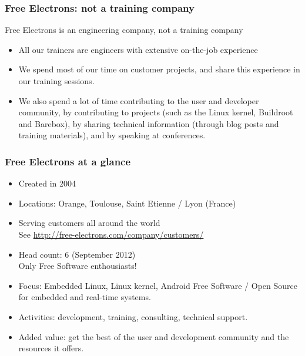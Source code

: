 \begin{frame}
\frametitle{Free Electrons: not a training company}
  Free Electrons is an engineering company, not a training company
  \begin{itemize}
    \item All our trainers are engineers with extensive on-the-job experience
    \item We spend most of our time on customer projects, and share this
          experience in our training sessions.
    \item We also spend a lot of time contributing to the user and developer
          community, by contributing to projects (such as the Linux kernel,
          Buildroot and Barebox), by sharing technical information (through
          blog posts and training materials), and by speaking at conferences.
  \end{itemize}
\end{frame}

\begin{frame}
\frametitle{Free Electrons at a glance}
  \begin{itemize}
    \item Created in 2004
    \item Locations: Orange, Toulouse, Saint Etienne / Lyon (France)
    \item Serving customers all around the world \\
          See \url{http://free-electrons.com/company/customers/}
    \item Head count: 6 (September 2012) \\
	  Only Free Software enthousiasts!
    \item Focus: Embedded Linux, Linux kernel, Android
          Free Software / Open Source
          for embedded and real-time systems.
    \item Activities: development, training, consulting, technical
          support.
    \item Added value: get the best of the user and development
          community and the resources it offers.
  \end{itemize}
\end{frame}

